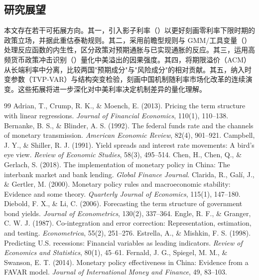\documentclass[12pt,a4paper]{ctexart}
\renewcommand{\citealp}[1]{\citep{#1}}
\begin{document}
\subsection{研究展望}
本文存在若干可拓展方向。其一，引入影子利率（\citealp{wuxia2016,hamilton2012}）以更好刻画零利率下限时期的政策立场，并据此重估泰勒规则。其二，采用前瞻型规则与 GMM/工具变量（\citealp{clarida2000}）处理反应函数的内生性，区分政策对预期通胀与已实现通胀的反应。其三，运用高频货币政策冲击识别（\citealp{miranda2020}）量化中美溢出的因果强度。其四，将期限溢价（ACM）从长端利率中分离，比较两国"预期成分"与"风险成分"的相对贡献。其五，纳入时变参数（TVP-VAR）与结构突变检验，刻画中国机制随利率市场化改革的连续演变。这些拓展将进一步深化对中美利率决定机制差异的量化理解。

\clearpage
\begin{thebibliography}{99}
\small
{} Adrian, T., Crump, R. K., \& Moench, E. (2013). Pricing the term structure with linear regressions. \emph{Journal of Financial Economics}, 110(1), 110--138.
 Bernanke, B. S., \& Blinder, A. S. (1992). The federal funds rate and the channels of monetary transmission. \emph{American Economic Review}, 82(4), 901--921.
 Campbell, J. Y., \& Shiller, R. J. (1991). Yield spreads and interest rate movements: A bird's eye view. \emph{Review of Economic Studies}, 58(3), 495--514.
 Chen, H., Chen, Q., \& Gerlach, S. (2018). The implementation of monetary policy in China: The interbank market and bank lending. \emph{Global Finance Journal}.
 Clarida, R., Gal\'i, J., \& Gertler, M. (2000). Monetary policy rules and macroeconomic stability: Evidence and some theory. \emph{Quarterly Journal of Economics}, 115(1), 147--180.
 Diebold, F. X., \& Li, C. (2006). Forecasting the term structure of government bond yields. \emph{Journal of Econometrics}, 130(2), 337--364.
 Engle, R. F., \& Granger, C. W. J. (1987). Co-integration and error correction: Representation, estimation, and testing. \emph{Econometrica}, 55(2), 251--276.
 Estrella, A., \& Mishkin, F. S. (1998). Predicting U.S. recessions: Financial variables as leading indicators. \emph{Review of Economics and Statistics}, 80(1), 45--61.
 Fernald, J. G., Spiegel, M. M., \& Swanson, E. T. (2014). Monetary policy effectiveness in China: Evidence from a FAVAR model. \emph{Journal of International Money and Finance}, 49, 83--103.

\end{thebibliography}
\end{document}
